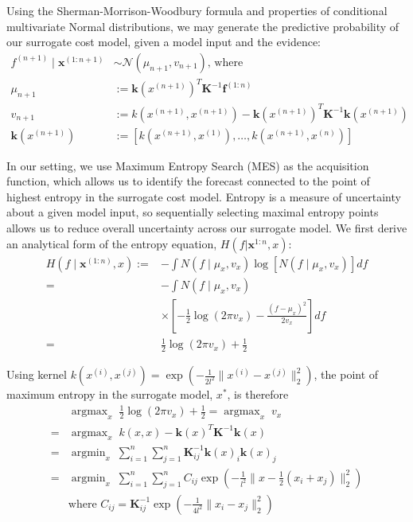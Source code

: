 \documentclass[10pt,twocolumn,letterpaper]{article}
\begin{document}
Using the Sherman-Morrison-Woodbury formula and properties of conditional multivariate Normal distributions, we may generate the predictive probability of our surrogate cost model, given a model input and the evidence:
\begin{align*}
    f^{(n+1)} \mid \textbf{x}^{(1:n+1)} &\sim \mathcal{N}(\mu_{n+1}, v_{n+1}) \textrm{, where}\\
    \mu_{n+1} &:= \textbf{k}(x^{(n+1)})^T\textbf{K}^{-1}\textbf{f}^{(1:n)}\\
    v_{n+1} &:= k(x^{(n+1)}, x^{(n+1)}) - \textbf{k}(x^{(n+1)})^T\textbf{K}^{-1}\textbf{k}(x^{(n+1)})\\
    \textbf{k}(x^{(n+1)}) &:= \left[k(x^{(n+1)}, x^{(1)}), \dots, k(x^{(n+1)}, x^{(n)})\right]
\end{align*}

In our setting, we use Maximum Entropy Search (MES) as the acquisition function, which allows us to identify the forecast connected to the point of highest entropy in the surrogate cost model. Entropy is a measure of uncertainty about a given model input, so sequentially selecting maximal entropy points allows us to reduce overall uncertainty across our surrogate model. We first derive an analytical form of the entropy equation, $H(f | \textbf{x}^{1:n}, x)$:
\begin{align*}
    H(f \mid \textbf{x}^{(1:n)}, x) :=& -\int N(f \mid \mu_x, v_x) \log\left[N(f \mid \mu_x, v_x)\right]df\\
    =& -\int N(f \mid \mu_x, v_x)\\
    &\times \left[-\frac{1}{2}\log(2\pi v_x) - \frac{(f - \mu_x)^2}{2v_x}\right]df\\
    =& \frac{1}{2}\log(2\pi v_x) + \frac{1}{2}
\end{align*}

Using kernel $k(x^{(i)}, x^{(j)}) = \exp\left(-\frac{1}{2l^2}\lVert x^{(i)} - x^{(j)}\rVert^2_2\right)$, the point of maximum entropy in the surrogate model, $x^*$, is therefore
\begin{align*}
    &\; \textrm{argmax}_x \;\; \frac{1}{2}\log(2\pi v_x) + \frac{1}{2} = \; \textrm{argmax}_x \;\; v_x \\
    =&\; \textrm{argmax}_x \;\; k(x, x) - \textbf{k}(x)^T\textbf{K}^{-1}\textbf{k}(x)\\
    =&\; \textrm{argmin}_x \;\; \sum_{i=1}^n\sum_{j=1}^n \textbf{K}^{-1}_{ij} \textbf{k}(x)_i \textbf{k}(x)_j\\
    =&\; \textrm{argmin}_x \;\; \sum_{i=1}^n\sum_{j=1}^n C_{ij} \exp\left(-\frac{1}{l^2}\lVert x - \frac{1}{2}(x_i + x_j)\rVert _2^2\right)\\
    &\textrm{where } C_{ij} = \textbf{K}^{-1}_{ij}\exp(-\frac{1}{4l^2}\lVert x_i - x_j\rVert^2_2)
\end{align*}
\end{document}
